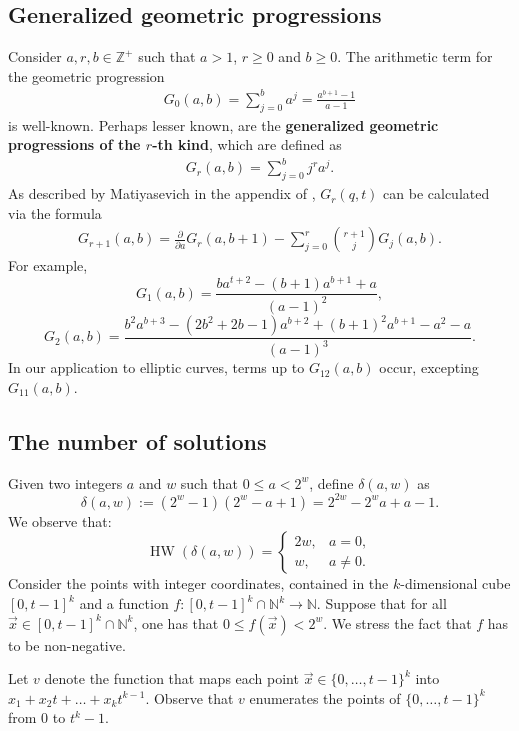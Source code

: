 \documentclass[10pt,a4paper]{article}
\theoremstyle{plain}
\newcommand{\HW}{\operatorname{HW}}
\newcommand{\Z}{\mathbb{Z}}
\begin{document}
\subsection{Generalized geometric progressions} \label{subsection:geoemtricprogressions}
Consider $a,r,b \in \Z^+$ such that $a > 1$, $r \geq 0$ and $b \geq 0$. The arithmetic term for the geometric progression
\begin{align*}
G_0(a,b) = \sum_{j=0}^b a^j = \frac{a^{b+1}-1}{a-1}
\end{align*}
is well-known. Perhaps lesser known, are the \textbf{generalized geometric progressions of the $r$-th kind}, which are defined as
\begin{align*}
G_r (a, b) = \sum_{j=0}^b j^r a^j .
\end{align*}
As described by Matiyasevich in the appendix of \cite{matiyasevich1993hilbert}, $G_r (q, t)$ can be calculated via the formula
\begin{align} \label{TermG}
 G_{r + 1} ( a , b ) = \frac{\partial}{\partial a} G_r ( a , b + 1 ) - \sum_{j=0}^r \binom{r+1}{j} G_j ( a , b ) .
\end{align} 
For example, 
 $$ G_1(a,b) =\dfrac{b a^{t+2} - (b+1)a^{b + 1} + a}{( a - 1 )^2} , $$ $$ G_2(a,b) = \dfrac{b^2 a^{b+3} - (2 b^2 + 2b - 1)a^{b+2} + (b+1)^2 a^{b+1} - a^2 - a}{( a - 1 )^3} .$$ 
In our application to elliptic curves, terms up to $G_{12}(a, b)$ occur, excepting $G_{11}(a,b)$.

\subsection{The number of solutions} 
\label{subsection:numberofsolutions} 

Given two integers $ a $ and $ w $ such that $ 0 \leq a < 2^w $, define $ \delta ( a , w ) $ as $$ \delta(a,w) := ( 2^w - 1 ) ( 2^w - a + 1 ) = 2^{2 w} - 2^w a + a - 1 .$$
We observe that:
$$\HW ( \delta ( a , w ) ) = \begin{cases} 2w, & a = 0, \\ w, & a \neq 0.\end{cases}$$
Consider the points with integer coordinates, contained in the $k$-dimensional cube $[0, t-1]^k$ and a function $f : [0, t-1]^k \cap \mathbb N^k \rightarrow \mathbb N$. Suppose that for all $\vec x \in [0, t-1]^k \cap \mathbb N^k $, one has that $0 \leq f(\vec x) < 2^w$. We stress the fact that $f$ has to be non-negative. 

Let $ v $ denote the function that maps each point $ \vec{x} \in \{ 0 , \dots , t - 1 \}^k $ into  $ x_1 + x_2 t  + \dots + x_k t ^{k - 1} $. Observe that $ v $ enumerates the points of $ \{ 0 , \dots , t  - 1 \}^k $ from $ 0 $ to $ t^k - 1 $.
\end{document}
